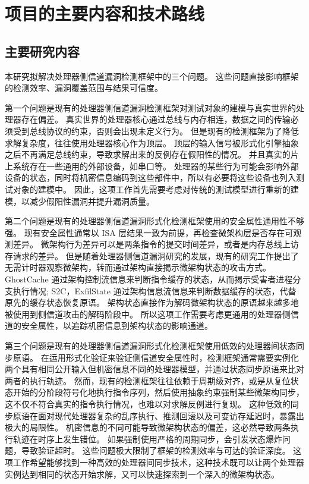 \section{项目的主要内容和技术路线}

\subsection{主要研究内容}

本研究拟解决处理器侧信道漏洞检测框架中的三个问题。
这些问题直接影响框架的检测效率、漏洞覆盖范围与结果可信度。

第一个问题是现有的处理器侧信道漏洞检测框架对测试对象的建模与真实世界的处理器存在偏差。
真实世界的处理器核心通过总线与内存相连，数据之间的传输必须受到总线协议的约束，否则会出现未定义行为。
但是现有的检测框架为了降低求解复杂度，往往使用处理器核心作为顶层。
顶层的输入信号被形式化引擎抽象之后不再满足总线约束，导致求解出来的反例存在假阳性的情况。
并且真实的片上系统存在一些通用的外部设备，如串口等。
处理器的某些行为可能会影响外部设备的状态，同时将机密信息编码到这些部件中，所以有必要将这些设备也列入测试对象的建模中。
因此，这项工作首先需要考虑对传统的测试模型进行重新的建模，以减少假阳性漏洞并提升漏洞质量。

第二个问题是现有的处理器侧信道漏洞形式化检测框架使用的安全属性通用性不够强。
现有安全属性通常以 ISA 层结果一致为前提，再检查微架构层是否存在可观测差异\cite{9519500}\cite{10.1145/3669940.3707243}\cite{10.1145/3613424.3614254}。
微架构行为差异可以是两条指令的提交时间差异，或者是内存总线上访存请求的差异。
但是随着处理器侧信道漏洞研究的发展，现有的研究工作提出了无需计时器观察微架构，转而通过架构直接揭示微架构状态的攻击方式。
GhostCache\cite{10.1145/3719027.3744833} 通过架构控制流信息来判断指令缓存的状态，从而揭示受害者进程分支执行情况;
S2C\cite{291182}，ExfilState\cite{10.1145/3719027.3765061} 通过架构信息流信息来判断数据缓存的状态，代替原先的缓存状态恢复原语\cite{184415}。
架构状态直接作为解码微架构状态的原语越来越多地被使用到侧信道攻击的解码阶段中。
所以这项工作需要考虑更通用的处理器侧信道的安全属性，以追踪机密信息到架构状态的影响通道。

第三个问题是现有的处理器侧信道漏洞形式化检测框架使用低效的处理器间状态同步原语。
在运用形式化验证来验证侧信道安全属性时，检测框架通常需要实例化两个具有相同公开输入但机密信息不同的处理器模型\cite{10.1007/11547662_24}，并通过状态同步原语来比对两者的执行轨迹。
然而，现有的检测框架往往依赖于周期级对齐\cite{10.1145/3669940.3707243}，或是从复位状态开始的分阶段符号化地执行指令序列\cite{10.1145/3613424.3614254}，然后使用抽象约束强制某些微架构同步，这不仅不符合真实的指令执行情况，也难以对求解反例进行复现。
这种低效的同步原语在面对现代处理器复杂的乱序执行、推测回滚以及可变访存延迟时，暴露出极大的局限性。
机密信息的不同可能导致微架构状态的偏差，这必然导致两条执行轨迹在时序上发生错位。
如果强制使用严格的周期同步，会引发状态爆炸问题，导致验证超时。
这些问题极大限制了框架的检测效率与可达的验证深度。
这项工作希望能够找到一种高效的处理器间同步技术，这种技术既可以让两个处理器实例达到相同的状态开始求解，又可以快速探索到一个深入的微架构状态。

